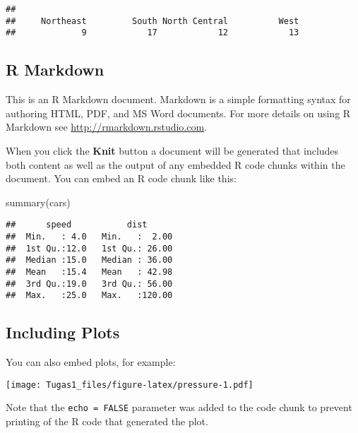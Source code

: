 \documentclass[
]{article}
\newenvironment{Shaded}{\begin{snugshade}}{\end{snugshade}}
\newcommand{\FunctionTok}[1]{\textcolor[rgb]{0.00,0.00,0.00}{#1}}
\newcommand{\NormalTok}[1]{#1}
\newcommand{\SpecialCharTok}[1]{\textcolor[rgb]{0.00,0.00,0.00}{#1}}
\begin{document}
\begin{Shaded}
\end{Shaded}

\begin{verbatim}
## 
##     Northeast         South North Central          West 
##             9            17            12            13
\end{verbatim}

\hypertarget{r-markdown}{%
\subsection{R Markdown}\label{r-markdown}}

This is an R Markdown document. Markdown is a simple formatting syntax
for authoring HTML, PDF, and MS Word documents. For more details on
using R Markdown see \url{http://rmarkdown.rstudio.com}.

When you click the \textbf{Knit} button a document will be generated
that includes both content as well as the output of any embedded R code
chunks within the document. You can embed an R code chunk like this:

\begin{Shaded}
\begin{Highlighting}[]
\FunctionTok{summary}\NormalTok{(cars)}
\end{Highlighting}
\end{Shaded}

\begin{verbatim}
##      speed           dist       
##  Min.   : 4.0   Min.   :  2.00  
##  1st Qu.:12.0   1st Qu.: 26.00  
##  Median :15.0   Median : 36.00  
##  Mean   :15.4   Mean   : 42.98  
##  3rd Qu.:19.0   3rd Qu.: 56.00  
##  Max.   :25.0   Max.   :120.00
\end{verbatim}

\hypertarget{including-plots}{%
\subsection{Including Plots}\label{including-plots}}

You can also embed plots, for example:

\texttt{[image: Tugas1\_files/figure-latex/pressure-1.pdf]}

Note that the \texttt{echo\ =\ FALSE} parameter was added to the code
chunk to prevent printing of the R code that generated the plot.
\end{document}
